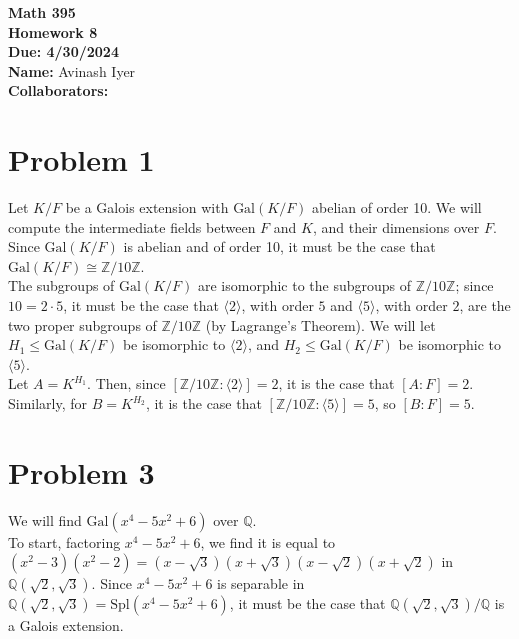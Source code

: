 \documentclass[10pt]{extarticle}
\title{}
\author{}
\date{}
\newcommand{\Q}{\mathbb{Q}}
\newcommand{\Z}{\mathbb{Z}}
\begin{document}
  \begin{center}
    {\bf \Large Math 395 \\[0.1in]Homework 8 \\[0.1in]
    Due: 4/30/2024}\\[.25in]
    {\bf Name:} {Avinash Iyer}\\[0.15in]
    {\bf Collaborators:} {} \\
  \end{center}
  \section{Problem 1}%
  Let $K/F$ be a Galois extension with $\text{Gal}(K/F)$ abelian of order 10. We will compute the intermediate fields between $F$ and $K$, and their dimensions over $F$.\\

    Since $\text{Gal}(K/F)$ is abelian and of order 10, it must be the case that $\text{Gal}(K/F)\cong \Z/10\Z$.\\

  The subgroups of $\text{Gal}(K/F)$ are isomorphic to the subgroups of $\Z/10\Z$; since $10 = 2\cdot 5$, it must be the case that $\langle 2 \rangle$, with order $5$ and $\langle 5 \rangle$, with order $2$, are the two proper subgroups of $\Z/10\Z$ (by Lagrange's Theorem). We will let $H_1 \leq \text{Gal}(K/F)$ be isomorphic to $\langle 2 \rangle$, and $H_2 \leq \text{Gal}(K/F)$ be isomorphic to $\langle 5 \rangle$.\\

  Let $A = K^{H_1}$. Then, since $[\Z/10\Z : \langle 2 \rangle] = 2$, it is the case that $[A:F] = 2$. Similarly, for $B = K^{H_2}$, it is the case that $[\Z/10\Z : \langle 5 \rangle] = 5$, so $[B:F] = 5$.
  \section{Problem 3}%
  We will find $\text{Gal}(x^4 - 5x^2 + 6)$ over $\Q$.\\

  To start, factoring $x^4 - 5x^2 + 6$, we find it is equal to $(x^2 - 3)(x^2 - 2) = (x-\sqrt{3})(x+\sqrt{3})(x-\sqrt{2})(x+\sqrt{2})$ in $\Q(\sqrt{2},\sqrt{3})$. Since $x^4 - 5x^2 + 6$ is separable in $\Q(\sqrt{2},\sqrt{3}) = \text{Spl}(x^4 - 5x^2 + 6)$, it must be the case that $\Q(\sqrt{2},\sqrt{3})/\Q$ is a Galois extension.\\
\end{document}
